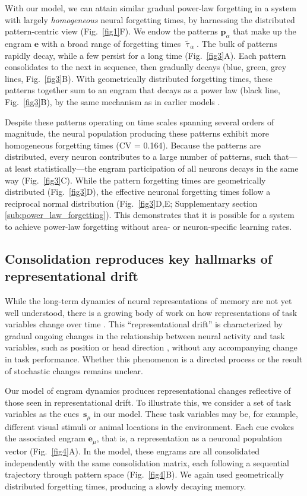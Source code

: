 With our model, we can attain similar gradual power-law forgetting in a system with largely \textit{homogeneous} neural forgetting times, by harnessing the distributed pattern-centric view (Fig.~\ref{fig1}F). We endow the patterns $\mathbf{p}_\alpha$ that make up the engram $\mathbf{e}$ with a broad range of forgetting times $\tilde{\uptau}_\alpha$. The bulk of patterns rapidly decay, while a few persist for a long time (Fig.~\ref{fig3}A). Each pattern consolidates to the next in sequence, then gradually decays (blue, green, grey lines, Fig.~\ref{fig3}B). With geometrically distributed forgetting times, these patterns together sum to an engram that decays as a power law (black line, Fig.~\ref{fig3}B), by the same mechanism as in earlier models \citep{Fusi2005, Remme2021}.

Despite these patterns operating on time scales spanning several orders of magnitude, the neural population producing these patterns exhibit more homogeneous forgetting times (CV = 0.164). Because the patterns are distributed, every neuron contributes to a large number of patterns, such that---at least statistically---the engram participation of all neurons decays in the same way (Fig.~\ref{fig3}C). While the pattern forgetting times are geometrically distributed (Fig.~\ref{fig3}D), the effective neuronal forgetting times follow a reciprocal normal distribution (Fig.~\ref{fig3}D,E; Supplementary section \ref{sub:power_law_forgetting}). This demonstrates that it is possible for a system to achieve power-law forgetting without area- or neuron-specific learning rates.

\subsection{Consolidation reproduces key hallmarks of representational drift}

While the long-term dynamics of neural representations of memory are not yet well understood, there is a growing body of work on how representations of task variables change over time \citep[e.g.,][]{Ziv2013,Driscoll2017,Schoonover2021}. This ``representational drift'' is characterized by gradual ongoing changes in the relationship between neural activity and task variables, such as position or head direction \citep{Rule2020}, without any accompanying change in task performance. Whether this phenomenon is a directed process or the result of stochastic changes remains unclear.

Our model of engram dynamics produces representational changes reflective of those seen in representational drift. To illustrate this, we consider a set of task variables as the cues~$\mathbf{s}_\mu$ in our model. These task variables may be, for example, different visual stimuli or animal locations in the environment. %
Each cue evokes the associated engram $\mathbf{e}_\mu$, that is, a representation as a neuronal population vector (Fig.~\ref{fig4}A). In the model, these engrams are all consolidated independently with the same consolidation matrix, each following a sequential trajectory through pattern space (Fig.~\ref{fig4}B). We again used geometrically distributed forgetting times, producing a slowly decaying memory.

